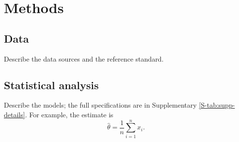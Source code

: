 \section{Methods}

\subsection{Data}
Describe the data sources and the reference standard.

\subsection{Statistical analysis}
Describe the models; the full specifications are in Supplementary
\cref{S-tab:supp-details}. For example, the estimate is
\begin{equation}
\hat{\theta} = \frac{1}{n}\sum_{i=1}^{n} x_i .
\label{eq:estimate}
\end{equation}
